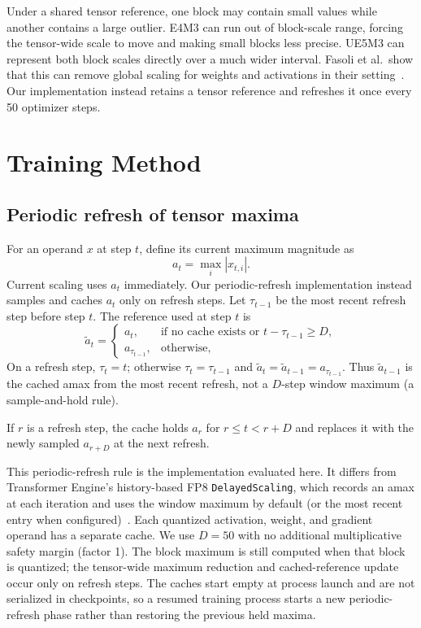 \documentclass[11pt]{article}
\newcommand{\ue}{UE5M3}
\begin{document}
Under a shared tensor reference, one block may contain small values while
another contains a large outlier.  E4M3 can run out of
block-scale range, forcing the tensor-wide scale to move and making small
blocks less precise.  \ue{} can represent both block scales directly over a
much wider interval.  Fasoli et al.\ show that this can remove global scaling
for weights and activations in their setting~\citep{fasoli2026finer}.  Our
implementation instead retains a tensor reference and refreshes it once every
50 optimizer steps.

\section{Training Method}
\label{sec:training-method}

\subsection{Periodic refresh of tensor maxima}

For an operand $x$ at step $t$, define its current maximum magnitude as
\begin{equation}
  a_t = \max_i |x_{t,i}|.
\end{equation}
Current scaling uses $a_t$ immediately.  Our periodic-refresh implementation
instead samples and caches $a_t$ only on refresh steps.  Let $\tau_{t-1}$ be
the most recent refresh step before step $t$.  The reference used at step $t$
is
\begin{equation}
  \widetilde a_t =
  \begin{cases}
    a_t, & \text{if no cache exists or } t-\tau_{t-1} \ge D,\\
    a_{\tau_{t-1}}, & \text{otherwise,}
  \end{cases}
  \label{eq:delayed-amax}
\end{equation}
On a refresh step, $\tau_t=t$; otherwise $\tau_t=\tau_{t-1}$ and
$\widetilde a_t=\widetilde a_{t-1}=a_{\tau_{t-1}}$.  Thus
$\widetilde a_{t-1}$ is the cached amax from the most recent refresh, not a
$D$-step window maximum (a sample-and-hold rule).

If $r$ is a refresh step, the cache holds $a_r$ for $r\le t<r+D$ and replaces
it with the newly sampled $a_{r+D}$ at the next refresh.

This periodic-refresh rule is the implementation evaluated here.  It differs
from Transformer Engine's history-based FP8 \texttt{DelayedScaling}, which
records an amax at each iteration and uses the window maximum by default (or
the most recent entry when configured)~\citep{nvidia2026delayeddocs}.  Each quantized activation, weight, and
gradient operand has a separate cache.  We use $D=50$ with no additional
multiplicative safety margin (factor 1).  The block maximum is still computed
when that block is quantized; the tensor-wide maximum reduction and
cached-reference update occur only on refresh steps.  The caches start empty at
process launch and are not serialized in checkpoints, so a resumed training
process starts a new periodic-refresh phase rather than restoring the previous
held maxima.
\end{document}
